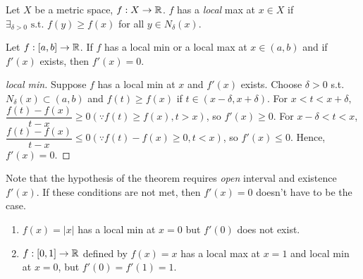 \begin{definition}
	\label{def:5.7}
	Let $X$ be a metric space, $f:X\to \mathbb{R}$. $f$ has a \textit{local} max at $x \in X$ if $\exists_{\delta > 0} \text{ s.t. } f(y)\ge f(x)$ for all $y \in N_{\delta}(x)$.
\end{definition}
\begin{thm}[8]
	Let $f:[a,b]\to \mathbb{R}$. If $f$ has a local min or a local max at $x \in (a,b)$ and if $f'(x)$ exists, then $f'(x)=0$.
	\begin{proof}[local min]
		Suppose $f$ has a local min at $x$ and $f'(x)$ exists. Choose $\delta>0$ s.t. $N_{\delta}(x) \subset (a,b)$ and $f(t)\ge f(x)$ if $t \in (x-\delta,x+\delta)$.
		For $x<t<x+\delta,$ $\dfrac{f(t)-f(x)}{t-x}\ge 0 (\because f(t)\ge f(x),t>x)$, so $f'(x)\ge 0$.
		For $x-\delta<t<x$, $\dfrac{f(t)-f(x)}{t-x}\le 0 (\because f(t)-f(x)\ge 0, t<x)$, so $f'(x) \le 0$.
		Hence, $f'(x)=0$.
	\end{proof}


	\begin{remark}
		Note that the hypothesis of the theorem requires \textit{open} interval and existence $f'(x)$. If these conditions are not met, then $f'(x)=0$ doesn't have to be the case.
		\begin{example}
			\begin{enumerate}
				\item $f(x)=|x|$ has a local min at $x=0$ but $f'(0)$ does not exist.
				\item $f:[0,1]\to \mathbb{R}$ defined by $f(x)=x$ has a local max at $x=1$ and local min at $x=0$, but $f'(0)=f'(1)=1$.
			\end{enumerate}
		\end{example}
	\end{remark}
\end{thm}

